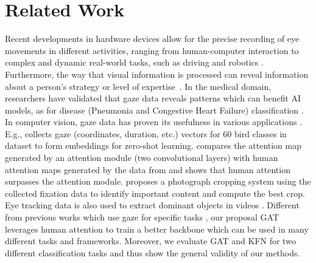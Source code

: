 \documentclass{bmvc2k}
\begin{document}
\section{Related Work}
\label{sec:relatedWork}
Recent developments in hardware devices allow for the precise recording of eye movements in different activities, ranging from human-computer interaction \cite{mathe2014actions, majaranta2014eye} to complex and dynamic real-world tasks, such as driving \cite{xia2020periphery, braunagel2017ready} and robotics \cite{weberdistilling, shafti2019gaze,aronson2018eye}. Furthermore, the way that visual information is processed can reveal information about a person's strategy or level of expertise~\cite{castner2020deep}. In the medical domain, researchers have validated that gaze data reveals patterns which can benefit AI models, as for disease (Pneumonia and Congestive Heart Failure) classification \cite{karargyris2021creation}.  In computer vision, gaze data has proven its usefulness in various applications \cite{santella2006gaze,shanmuga2015eye,Karessli_2017_CVPR,qiuxia2020understanding}. E.g., \cite{Karessli_2017_CVPR} collects gaze (coordinates, duration, etc.) vectors for 60 bird classes in dataset \cite{WelinderEtal2010} to form embeddings for zero-shot learning. \cite{qiuxia2020understanding} compares the attention map generated by an attention module (two convolutional layers) with human attention maps generated by the data from \cite{Karessli_2017_CVPR} and shows that human attention surpasses the attention module. \cite{santella2006gaze} proposes a photograph cropping system using the collected fixation data to identify important content and compute the best crop. Eye tracking data is also used to extract dominant objects in videos \cite{shanmuga2015eye}. Different from previous works which use gaze for specific tasks \cite{santella2006gaze,shanmuga2015eye,Karessli_2017_CVPR}, our proposal GAT leverages human attention to train a better backbone which can be used in many different tasks and frameworks. Moreover, we evaluate GAT and KFN for two different classification tasks and thus show the general validity of our methods.
 
\end{document}
